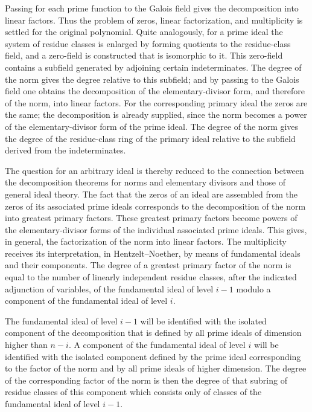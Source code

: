 \documentclass[12pt]{article}
\begin{document}
Passing for each prime function to the Galois field gives the decomposition into linear factors. Thus the problem of zeros, linear factorization, and multiplicity is settled for the original polynomial. Quite analogously, for a prime ideal the system of residue classes is enlarged by forming quotients to the residue-class field, and a zero-field is constructed that is isomorphic to it. This zero-field contains a subfield generated by adjoining certain indeterminates. The degree of the norm gives the degree relative to this subfield; and by passing to the Galois field one obtains the decomposition of the elementary-divisor form, and therefore of the norm, into linear factors. For the corresponding primary ideal the zeros are the same; the decomposition is already supplied, since the norm becomes a power of the elementary-divisor form of the prime ideal. The degree of the norm gives the degree of the residue-class ring of the primary ideal relative to the subfield derived from the indeterminates.

The question for an arbitrary ideal is thereby reduced to the connection between the decomposition theorems for norms and elementary divisors and those of general ideal theory. The fact that the zeros of an ideal are assembled from the zeros of its associated prime ideals corresponds to the decomposition of the norm into greatest primary factors. These greatest primary factors become powers of the elementary-divisor forms of the individual associated prime ideals. This gives, in general, the factorization of the norm into linear factors. The multiplicity receives its interpretation, in Hentzelt--Noether, by means of fundamental ideals and their components. The degree of a greatest primary factor of the norm is equal to the number of linearly independent residue classes, after the indicated adjunction of variables, of the fundamental ideal of level $i-1$ modulo a component of the fundamental ideal of level $i$.

The fundamental ideal of level $i-1$ will be identified with the isolated component of the decomposition that is defined by all prime ideals of dimension higher than $n-i$. A component of the fundamental ideal of level $i$ will be identified with the isolated component defined by the prime ideal corresponding to the factor of the norm and by all prime ideals of higher dimension. The degree of the corresponding factor of the norm is then the degree of that subring of residue classes of this component which consists only of classes of the fundamental ideal of level $i-1$.
\end{document}
